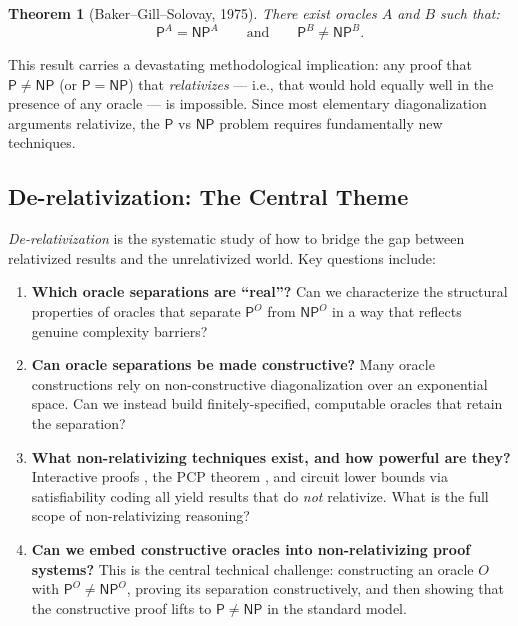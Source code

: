 \documentclass[11pt,a4paper]{article}
\theoremstyle{plain}
\newtheorem{theorem}{Theorem}[section]
\theoremstyle{definition}
\theoremstyle{remark}
\newcommand{\PP}{\mathsf{P}}
\newcommand{\NP}{\mathsf{NP}}
\begin{document}
\begin{theorem}[Baker--Gill--Solovay, 1975]
There exist oracles $A$ and $B$ such that:
\[
    \PP^A = \NP^A \qquad\text{and}\qquad \PP^B \neq \NP^B.
\]
\end{theorem}

This result carries a devastating methodological implication: any proof that
$\PP \neq \NP$ (or $\PP = \NP$) that \emph{relativizes} — i.e., that would hold
equally well in the presence of any oracle — is impossible.  Since most
elementary diagonalization arguments relativize, the $\PP$ vs $\NP$ problem
requires fundamentally new techniques.

\subsection{De-relativization: The Central Theme}

\emph{De-relativization} is the systematic study of how to bridge the gap
between relativized results and the unrelativized world.  Key questions include:

\begin{enumerate}[label=(\roman*)]
    \item \textbf{Which oracle separations are ``real''?}  Can we characterize
    the structural properties of oracles that separate $\PP^O$ from $\NP^O$ in a
    way that reflects genuine complexity barriers?

    \item \textbf{Can oracle separations be made constructive?}  Many oracle
    constructions rely on non-constructive diagonalization over an exponential
    space.  Can we instead build finitely-specified, computable oracles that
    retain the separation?

    \item \textbf{What non-relativizing techniques exist, and how powerful are
    they?}  Interactive proofs \cite{GMR89,Shamir92}, the PCP theorem
    \cite{ALMSS98}, and circuit lower bounds via satisfiability coding
    \cite{Kannan82} all yield results that do \emph{not} relativize.  What is
    the full scope of non-relativizing reasoning?

    \item \textbf{Can we embed constructive oracles into non-relativizing proof
    systems?}  This is the central technical challenge: constructing an oracle
    $O$ with $\PP^O \neq \NP^O$, proving its separation constructively, and then
    showing that the constructive proof lifts to $\PP \neq \NP$ in the standard
    model.
\end{enumerate}
\end{document}
